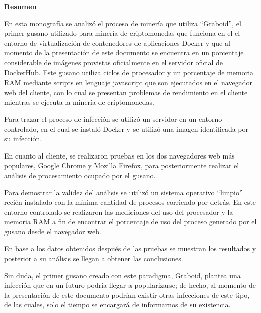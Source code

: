 \documentclass[../main/main.tex]{subfiles}
\begin{document}
  \begin{center}
    \textbf{\large Resumen}
  \end{center}

  En esta monografía se analizó el proceso de minería que utiliza ``Graboid'', el primer gusano utilizado para minería de criptomonedas que funciona en el el entorno de virtualización de contenedores de aplicaciones Docker y que al momento de la presentación de este documento se encuentra en un porcentaje considerable de imágenes provistas oficialmente en el servidor oficial de DockerHub. Este gusano utiliza ciclos de procesador y un porcentaje de memoria RAM mediante scripts en lenguaje javascript que son ejecutados en el navegador web del cliente, con lo cual se presentan problemas de rendimiento en el cliente mientras se ejecuta la minería de criptomonedas.

  Para trazar el proceso de infección se utilizó un servidor en un entorno controlado, en el cual se instaló Docker y se utilizó una imagen identificada por su infección.

  En cuanto al cliente, se realizaron pruebas en los dos navegadores web más populares, Google Chrome y Mozilla Firefox, para posteriormente realizar el análisis de procesamiento ocupado por el gusano.

  Para demostrar la validez del análisis se utilizó un sistema operativo ``limpio'' recién instalado con la mínima cantidad de procesos corriendo por detrás. En este entorno controlado se realizaron las mediciones del uso del procesador y la memoria RAM a fin de encontrar el porcentaje de uso del proceso generado por el gusano desde el navegador web.

  En base a los datos obtenidos después de las pruebas se muestran los resultados y posterior a su análisis se llegan a obtener las conclusiones.

  Sin duda, el primer gusano creado con este paradigma, Graboid, plantea una infección que en un futuro podría llegar a popularizarse; de hecho, al momento de la presentación de este documento podrían existir otras infecciones de este tipo, de las cuales, solo el tiempo se encargará de informarnos de su existencia.
\end{document}
